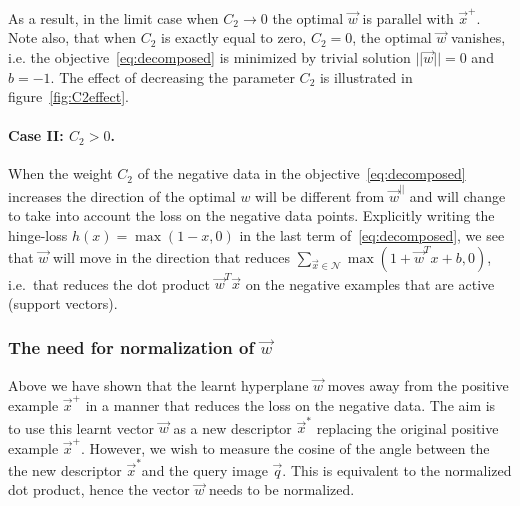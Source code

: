           As a result, in the limit case when $C_2 \rightarrow 0$ the optimal $\vec{w}$ is parallel with $\vec{x}^+$. Note also, that when $C_2$ is exactly equal to zero, $C_2 = 0$, the optimal $\vec{w}$ vanishes, i.e. the objective~\eqref{eq:decomposed} is minimized by trivial solution $||\vec{w}|| = 0$ and $b = -1$. The effect of decreasing the parameter $C_2$ is illustrated in figure~\ref{fig:C2effect}.

      \paragraph{Case II: $C_2>0$.}
         When the weight $C_2$ of the negative data in the objective~\eqref{eq:decomposed} increases the direction of the optimal $w$ will be different from $\vec{w}^{||}$ and will change to take into account the loss on the negative data points. Explicitly writing the hinge-loss $h(x) = \max(1-x,0)$ in the last term of~\eqref{eq:decomposed}, we see that $\vec{w}$ will move in the direction that reduces $\sum_{\vec{x} \in \mathcal N}\max \left(1+\vec{w}^T x + b ,0 \right)$, i.e.\ that reduces the dot product $\vec{w}^T \vec{x}$ on the negative examples that are active (support vectors).
                           
      \subsubsection*{The need for normalization of $\vec{w}$} 
      \label{sec:renormalization}
         Above we have shown that the learnt hyperplane $\vec{w}$ moves away from the positive example $\vec{x}^+$ in a manner that reduces the loss  on the negative data. The aim is to use this learnt vector $\vec{w}$ as a new descriptor $\vec{x}^*$  replacing the original positive example $\vec{x}^+$. However, we wish to measure the cosine of the angle between the the new descriptor $\vec{x}^*$and the query image $\vec{q}$. This is equivalent to the normalized dot product, hence the vector $\vec{w}$ needs to be normalized.


